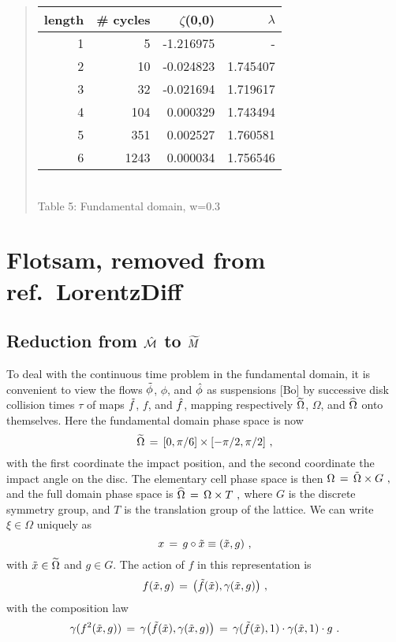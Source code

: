 \begin{quote} \begin{center}
\begin{tabular}{|r|r|r|r|}
\hline
length & \# cycles & $\zeta$(0,0) & $\lambda$ \\ \hline\hline
1      &    5     &  -1.216975 &     -    \\
2      &   10     &  -0.024823 & 1.745407 \\
3      &   32     &  -0.021694 & 1.719617 \\
4      &  104     &   0.000329 & 1.743494 \\
5      &  351     &   0.002527 & 1.760581 \\
6      & 1243     &   0.000034 & 1.756546 \\ \hline
\end{tabular}\\[10pt]
{Table 5: Fundamental domain, w=0.3}
\end{center}\end{quote}


\renewcommand{\thesection}{}
\section{Flotsam, removed from ref.~{LorentzDiff}}


\subsection{Reduction from $\hat {{\cal M}}$ to ${\widetilde M}$}


To deal with the continuous time problem in the fundamental domain, it is
convenient to view the flows $\tilde \phi$, $\phi$, and $\hat \phi$
as suspensions [Bo] by successive disk collision times $\tau$
of maps $\tilde f$, $f$, and $\hat f$,
mapping respectively $\widetilde\Omega$, $\Omega$, and $\widehat\Omega$ onto themselves. Here
the fundamental domain phase space is now
$$
\widetilde\Omega  \,=\,   [0,\pi/6] \times [-\pi/2,\pi/2]~,
$$
with the first coordinate the impact position, and the second
coordinate the impact angle on the disc.
The elementary cell phase space is then
$
\Omega \,=\,  \tilde \Omega \times G~,
$
and the full domain phase space is
$
\widehat\Omega \,=\,   \Omega \times T~,
$
where $G$ is the discrete symmetry group, and $T$ is the translation group of
the lattice.
We can write $\xi\in \Omega$ uniquely as
$$
x \,=\,  g\circ \tilde{x} \equiv (\tilde{x},g)~,
$$
with $\tilde{x}\in\widetilde\Omega$ and $g\in G$.
The action of $f$ in this representation is
$$
f(\tilde{x},g) \,=\,  \bigl (\tilde f(\tilde{x}), \gamma(\tilde{x},g)\bigr )~,
$$
with the composition law
$$
\gamma(f^2(\tilde{x},g)) \,=\,  \gamma\bigl (\tilde f(\tilde{x}),\gamma(\tilde{x},g)\bigr ) \,=\,
\gamma(\tilde f(\tilde{x}),1)\cdot \gamma(\tilde{x},1)\cdot g~.
$$

